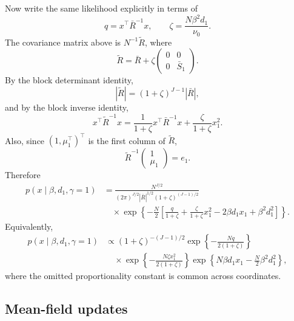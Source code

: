\documentclass[11pt]{article}
\newcommand{\Rbar}{\bar R}
\newcommand{\Sbar}{\bar S}
\begin{document}
Now write the same likelihood explicitly in terms of
\[
q=x^\top\Rbar^{-1}x,
\qquad
\zeta=\frac{N\beta^2d_1}{\nu_0}.
\]
The covariance matrix above is \(N^{-1}\widetilde R\), where
\[
\widetilde R
=
\Rbar+\zeta
\begin{pmatrix}
0 & 0\\
0 & \Sbar_1
\end{pmatrix}.
\]
By the block determinant identity,
\[
|\widetilde R|=(1+\zeta)^{J-1}|\Rbar|,
\]
and by the block inverse identity,
\[
x^\top\widetilde R^{-1}x
=
\frac{1}{1+\zeta}x^\top\Rbar^{-1}x
+\frac{\zeta}{1+\zeta}x_1^2.
\]
Also, since \((1,\mu_1^\top)^\top\) is the first column of
\(\widetilde R\),
\[
\widetilde R^{-1}
\begin{pmatrix}
1\\\mu_1
\end{pmatrix}
=e_1.
\]
Therefore
\begin{align}
p(x\mid \beta,d_1,\gamma=1)
&=
\frac{N^{J/2}}
{(2\pi)^{J/2}|\Rbar|^{1/2}(1+\zeta)^{(J-1)/2}}
\nonumber\\
&\quad\times
\exp\left\{
-\frac{N}{2}
\left[
\frac{q}{1+\zeta}
+\frac{\zeta}{1+\zeta}x_1^2
-2\beta d_1x_1
+\beta^2d_1^2
\right]
\right\}.
\end{align}
Equivalently,
\begin{align}
p(x\mid \beta,d_1,\gamma=1)
&\propto
(1+\zeta)^{-(J-1)/2}
\exp\left\{-\frac{Nq}{2(1+\zeta)}\right\}
\nonumber\\
&\quad\times
\exp\left\{-\frac{N\zeta x_1^2}{2(1+\zeta)}\right\}
\exp\left\{N\beta d_1x_1-\frac{N}{2}\beta^2d_1^2\right\},
\end{align}
where the omitted proportionality constant is common across coordinates.

\subsection{Mean-field updates}
\end{document}
